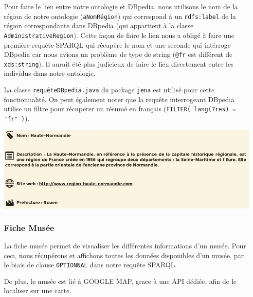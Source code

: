 \documentclass{article}
\begin{document}
Pour faire le lien entre notre ontologie et DBpedia, nous utilisons le nom de la
région de notre ontologie (\texttt{aNomRégion}) qui correspond à un
\texttt{rdfs:label} de la région correspondante dans DBpedia (qui appartient à
la classe \texttt{AdministrativeRegion}).
Cette façon de faire le lien nous a obligé à faire une première requête SPARQL
qui récupère le nom et une seconde qui intérroge DBpedia car nous avions un
problème de type de string (\texttt{@fr} est différent de \texttt{xds:string}).
Il aurait été plus judicieux de faire le lien directement entre les individus dans notre ontologie.

\vspace{0.3cm}

La classe \texttt{requêteDBpedia.java} du package \texttt{jena} est utilisé pour
cette fonctionnalité. On peut également noter que la requête interrogeant
DBpedia utilise un filtre pour récuperer un résumé en français (\texttt{FILTER(
lang(?res) = "fr" )}).

\begin{center}
\includegraphics[width=14cm]{trouveMuseeRegion.png}
\end{center}

\subsubsection{Fiche Musée}

La fiche musée permet de visualiser les différentes informations d'un musée.
Pour ceci, nous récupérons et affichons toutes les données disponibles d'un
musée, par le biais de clause \texttt{OPTIONNAL} dans notre requête SPARQL.

De plus, le musée est lié à GOOGLE MAP, grace à une API dédiée, afin de le
localiser sur une carte.
\end{document}
